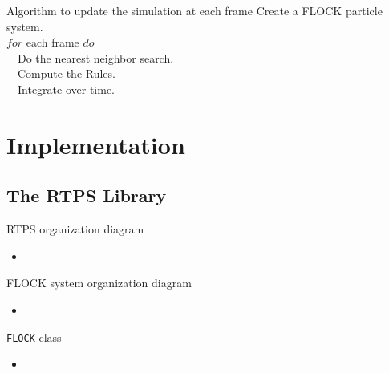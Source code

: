 \documentclass[red]{beamer}
\begin{document}
\begin{frame}{Algorithm to update the simulation at each frame}
		\alert<1>{Create a FLOCK particle system.}	\\
		\alert<2>{$for$ each frame $do$}			\\
		\alert<3>{~~Do the nearest neighbor search.}	\\
		\alert<4>{~~Compute the Rules.}				\\
		\alert<5>{~~Integrate over time.}				\\	
\end{frame}


\section{Implementation}

\subsection{The RTPS Library}

\begin{frame}{RTPS organization diagram}
	\begin{itemize}
		\pause \item
	\end{itemize}
\end{frame}

\begin{frame}{FLOCK system organization diagram}
	\begin{itemize}
		\pause \item
	\end{itemize}
\end{frame}

\begin{frame}{\texttt{FLOCK} class}
	\begin{itemize}
		\pause \item
	\end{itemize}
\end{frame}
\end{document}
